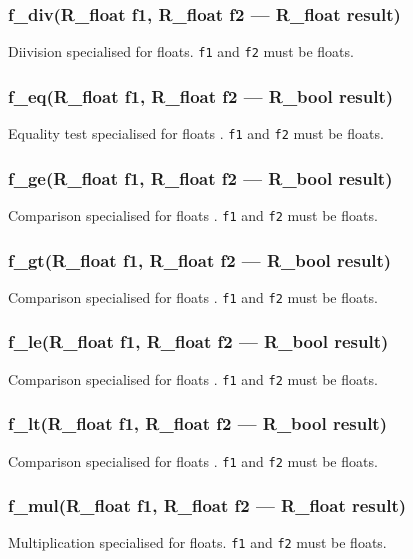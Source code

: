 \subsubsection{f\_div(R\_float f1, R\_float f2 --- R\_float result)}
\vspace{-1em}Diivision specialised for floats. \texttt{f1} and \texttt{f2} must be floats. \vspace{-1em}
\subsubsection{f\_eq(R\_float f1, R\_float f2 --- R\_bool result)}
\vspace{-1em}Equality test specialised for floats . \texttt{f1} and \texttt{f2} must be floats. \vspace{-1em}
\subsubsection{f\_ge(R\_float f1, R\_float f2 --- R\_bool result)}
\vspace{-1em}Comparison specialised for floats . \texttt{f1} and \texttt{f2} must be floats. \vspace{-1em}
\subsubsection{f\_gt(R\_float f1, R\_float f2 --- R\_bool result)}
\vspace{-1em}Comparison specialised for floats . \texttt{f1} and \texttt{f2} must be floats. \vspace{-1em}
\subsubsection{f\_le(R\_float f1, R\_float f2 --- R\_bool result)}
\vspace{-1em}Comparison specialised for floats . \texttt{f1} and \texttt{f2} must be floats. \vspace{-1em}
\subsubsection{f\_lt(R\_float f1, R\_float f2 --- R\_bool result)}
\vspace{-1em}Comparison specialised for floats . \texttt{f1} and \texttt{f2} must be floats. \vspace{-1em}
\subsubsection{f\_mul(R\_float f1, R\_float f2 --- R\_float result)}
\vspace{-1em}Multiplication specialised for floats. \texttt{f1} and \texttt{f2} must be floats. \vspace{-1em}
